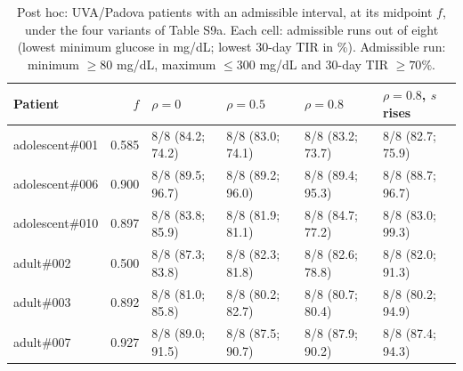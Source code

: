 \begin{table}[H]
\centering
\caption{Post hoc: UVA/Padova patients with an admissible interval, at its midpoint $f$, under the four variants of Table S9a. Each cell: admissible runs out of eight (lowest minimum glucose in mg/dL; lowest 30-day TIR in \%). Admissible run: minimum $\ge80$ mg/dL, maximum $\le300$ mg/dL and 30-day TIR $\ge70\%$.}\label{tab:S9b}
\scriptsize
\begin{tabular}{lrllll}
\toprule
Patient & $f$ & $\rho=0$ & $\rho=0.5$ & $\rho=0.8$ & $\rho=0.8$, $s$ rises \\
\midrule
adolescent\#001 & 0.585 & 8/8 (84.2; 74.2) & 8/8 (83.0; 74.1) & 8/8 (83.2; 73.7) & 8/8 (82.7; 75.9) \\
adolescent\#006 & 0.900 & 8/8 (89.5; 96.7) & 8/8 (89.2; 96.0) & 8/8 (89.4; 95.3) & 8/8 (88.7; 96.7) \\
adolescent\#010 & 0.897 & 8/8 (83.8; 85.9) & 8/8 (81.9; 81.1) & 8/8 (84.7; 77.2) & 8/8 (83.0; 99.3) \\
adult\#002 & 0.500 & 8/8 (87.3; 83.8) & 8/8 (82.3; 81.8) & 8/8 (82.6; 78.8) & 8/8 (82.0; 91.3) \\
adult\#003 & 0.892 & 8/8 (81.0; 85.8) & 8/8 (80.2; 82.7) & 8/8 (80.7; 80.4) & 8/8 (80.2; 94.9) \\
adult\#007 & 0.927 & 8/8 (89.0; 91.5) & 8/8 (87.5; 90.7) & 8/8 (87.9; 90.2) & 8/8 (87.4; 94.3) \\
\bottomrule
\end{tabular}
\end{table}
